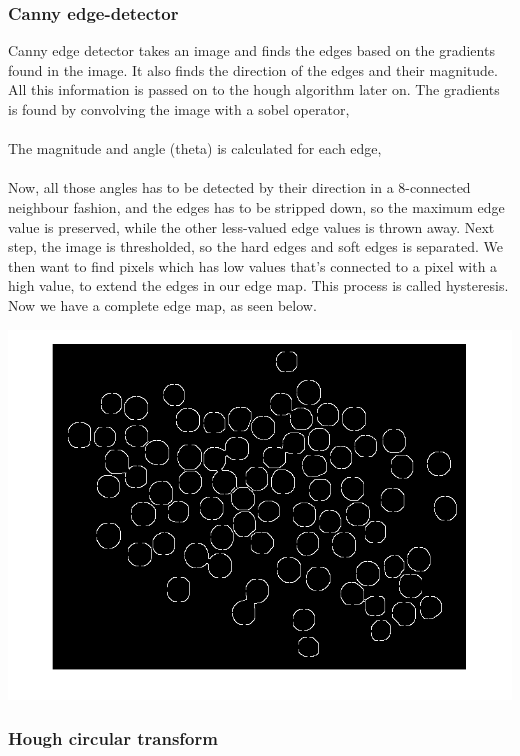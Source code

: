 \subsubsection{Canny edge-detector}
Canny edge detector takes an image and finds the edges based on the gradients found in the image. It also finds the direction of the edges and their magnitude. All this information is passed on to the hough algorithm later on. The gradients is found by convolving the image with a sobel operator,
\\

\mbox{}\\
The magnitude and angle (theta) is calculated for each edge,
\\

\mbox{}\\
Now, all those angles has to be detected by their direction in a 8-connected neighbour fashion, and the edges has to be stripped down, so the maximum edge value is preserved, while the other less-valued edge values is thrown away. Next step, the image is thresholded, so the hard edges and soft edges is separated. We then want to find pixels which has low values that's connected to a pixel with a high value, to extend the edges in our edge map. This process is called hysteresis. Now we have a complete edge map, as seen below.
\\
\centerline{\includegraphics[scale=0.3]{../results/sweetsA03_edges.png}}
\subsubsection{Hough circular transform}

